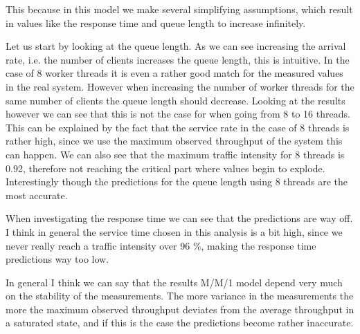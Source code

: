 \documentclass[11pt,a4paper]{article}
\begin{document}
%
This because in this model we make several simplifying assumptions, which result in values like the response time and queue length to increase infinitely.
%
\par
%
Let us start by looking at the queue length.
%
As we can see increasing the arrival rate, i.e. the number of clients increases the queue length, this is intuitive. 
%
In the case of 8 worker threads it is even a rather good match for the measured values in the real system.
%
However when increasing the number of worker threads for the same number of clients the queue length should decrease.
%
Looking at the results however we can see that this is not the case for when going from 8 to 16 threads.
%
This can be explained by the fact that the service rate in the case of 8 threads is rather high, since we use the maximum observed throughput of the system this can happen.
%
We can also see that the maximum traffic intensity for 8 threads is 0.92, therefore not reaching the critical part where values begin to explode.
%
Interestingly though the predictions for the queue length using 8 threads are the most accurate.
%
\par
%
When investigating the response time we can see that the predictions are way off.
%
I think in general the service time chosen in this analysis is a bit high, since we never really reach a traffic intensity over 96 \%, making the response time predictions way too low.
%
\par
%
In general I think we can say that the results M/M/1 model depend very much on the stability of the measurements.
%
The more variance in the measurements the more the maximum observed throughput deviates from the average throughput in a saturated state, and if this is the case the predictions become rather inaccurate.
%
\end{document}
